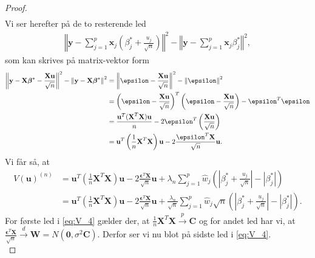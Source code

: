 \begin{proof}
\begin{align*}
\end{align*}
Vi ser herefter på de to resterende led
\begin{align*}
\left\Vert \textbf{y} - \sum_{j=1}^p \textbf{x}_j \left( \beta_j^{*} + \frac{u_j}{\sqrt{n}} \right) \right\Vert^2 -\left\Vert \textbf{y} - \sum_{j=1}^p \textbf{x}_j \beta_j^{*} \right\Vert^2,
\end{align*}
som kan skrives på matrix-vektor form
\begin{align*}
\left\Vert \textbf{y}-\textbf{X}\boldsymbol{\beta}^{*} -\frac{\textbf{X}\textbf{u}}{\sqrt{n}} \right\Vert^2 - \left\Vert \textbf{y} - \textbf{X} \boldsymbol{\beta}^{*} \right\Vert^2  & =
\left\Vert \boldsymbol{\epsilon} - \frac{\textbf{X}\textbf{u}}{\sqrt{n}} \right\Vert^2 - \left\Vert \boldsymbol{\epsilon} \right\Vert^2  \\
&= \del{\boldsymbol{\epsilon} - \frac{\textbf{X}\textbf{u}}{\sqrt{n}}}^T \del{\boldsymbol{\epsilon} - \frac{\textbf{X}\textbf{u}}{\sqrt{n}}} - \boldsymbol{\epsilon}^T \boldsymbol{\epsilon} \\
& = \frac{\textbf{u}^T (\textbf{X}^T\textbf{X})  \textbf{u}}{n} - 2 \boldsymbol{\epsilon}^T \left( \frac{\mathbf{X}\mathbf{u}}{\sqrt{n}} \right) \\ 
&= \textbf{u}^T \left(\frac{1}{n}\textbf{X}^T\textbf{X}\right)  \textbf{u}- 2 \frac{\boldsymbol{\epsilon}^T \textbf{X}}{\sqrt{n}}\textbf{u}.
\end{align*}
Vi får så, at 
\begin{align}
V(\mathbf{u})^{(n)} & = \textbf{u}^T \left(\frac{1}{n}\textbf{X}^T\textbf{X}\right)  \textbf{u} - 2 \frac{\boldsymbol{\epsilon}^T \textbf{X}}{\sqrt{n}}\textbf{u} + \lambda_n \sum_{j=1}^p \hat{w}_j \left( \left\vert \beta_j^{*} + \frac{u_j}{\sqrt{n}} \right\vert - \left\vert \beta_j^{*}\right\vert
\right) \nonumber \\
 & = \textbf{u}^T \left(\frac{1}{n}\textbf{X}^T\textbf{X}\right)  \textbf{u} - 2 \frac{\boldsymbol{\epsilon}^T \textbf{X}}{\sqrt{n}}\textbf{u} +\frac{\lambda_n}{\sqrt{n}} \sum_{j=1}^p \hat{w}_j \sqrt{n} \left( \left\vert \beta_j^{*} + \frac{u_j}{\sqrt{n}} \right\vert - \left\vert \beta_j^{*} \right\vert
\right). \label{eq:V_4}
\end{align}
%
For første led i \eqref{eq:V_4} gælder der, at $\frac{1}{n} \mathbf{X}^T \mathbf{X} \overset{p}{\rightarrow} \mathbf{C}$ og for andet led har vi, at $\frac{\boldsymbol{\epsilon}^T \mathbf{X}}{\sqrt{n}} \overset{d}{\rightarrow} \textbf{W}=N(\textbf{0},\sigma^2 \boldsymbol{C})$. 
Derfor ser vi nu blot på sidste led i \eqref{eq:V_4}. \\

\end{proof}
